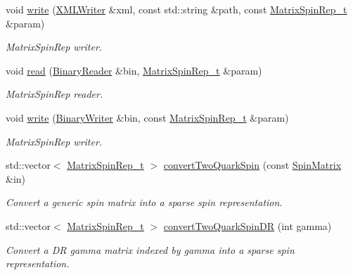 \begin{DoxyCompactItemize}
void \mbox{\hyperlink{namespaceHadron_a433908e65befd36f268196398b8469c7}{write}} (\mbox{\hyperlink{classADATXML_1_1XMLWriter}{X\+M\+L\+Writer}} \&xml, const std\+::string \&path, const \mbox{\hyperlink{structHadron_1_1MatrixSpinRep__t}{Matrix\+Spin\+Rep\+\_\+t}} \&param)
\begin{DoxyCompactList}\small\item\em Matrix\+Spin\+Rep writer. \end{DoxyCompactList}\item 
void \mbox{\hyperlink{namespaceHadron_af8ce56081c184ce7dd924a192bff08a6}{read}} (\mbox{\hyperlink{classADATIO_1_1BinaryReader}{Binary\+Reader}} \&bin, \mbox{\hyperlink{structHadron_1_1MatrixSpinRep__t}{Matrix\+Spin\+Rep\+\_\+t}} \&param)
\begin{DoxyCompactList}\small\item\em Matrix\+Spin\+Rep reader. \end{DoxyCompactList}\item 
void \mbox{\hyperlink{namespaceHadron_ae38baf2d1cfe9fdaf455f274e722b32f}{write}} (\mbox{\hyperlink{classADATIO_1_1BinaryWriter}{Binary\+Writer}} \&bin, const \mbox{\hyperlink{structHadron_1_1MatrixSpinRep__t}{Matrix\+Spin\+Rep\+\_\+t}} \&param)
\begin{DoxyCompactList}\small\item\em Matrix\+Spin\+Rep writer. \end{DoxyCompactList}\item 
std\+::vector$<$ \mbox{\hyperlink{structHadron_1_1MatrixSpinRep__t}{Matrix\+Spin\+Rep\+\_\+t}} $>$ \mbox{\hyperlink{namespaceHadron_a6bcb90f42724a0f4ce09eeb64bd54c80}{convert\+Two\+Quark\+Spin}} (const \mbox{\hyperlink{group__defs_gad066768e154e358a7f3c0708c774be29}{Spin\+Matrix}} \&in)
\begin{DoxyCompactList}\small\item\em Convert a generic spin matrix into a sparse spin representation. \end{DoxyCompactList}\item 
std\+::vector$<$ \mbox{\hyperlink{structHadron_1_1MatrixSpinRep__t}{Matrix\+Spin\+Rep\+\_\+t}} $>$ \mbox{\hyperlink{namespaceHadron_aadefc7d519d40f16cb37c4df644944e7}{convert\+Two\+Quark\+Spin\+DR}} (int gamma)
\begin{DoxyCompactList}\small\item\em Convert a DR gamma matrix indexed by gamma into a sparse spin representation. \end{DoxyCompactList}\item 

\end{DoxyCompactItemize}
